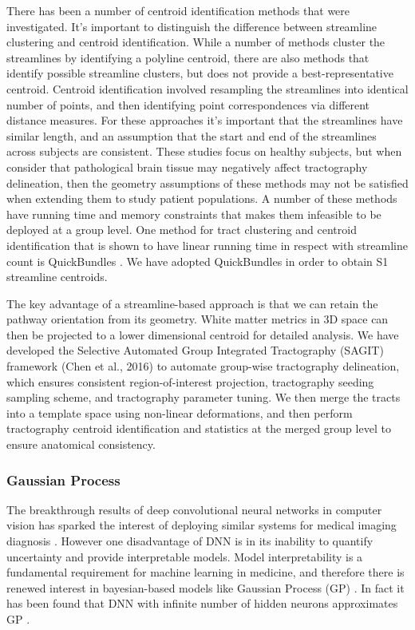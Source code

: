 There has been a number of centroid identification methods that were investigated. It’s important to distinguish the difference between streamline clustering and centroid identification. While a number of methods cluster the streamlines by identifying a polyline centroid, there are also methods that identify possible streamline clusters, but does not provide a best-representative centroid. Centroid identification involved resampling the streamlines into identical number of points, and then identifying point correspondences via different distance measures. For these approaches it’s important that the streamlines have similar length, and an assumption that the start and end of the streamlines across subjects are consistent. These studies focus on healthy subjects, but when consider that pathological brain tissue may negatively affect tractography delineation, then the geometry assumptions of these methods may not be satisfied when extending them to study patient populations. A number of these methods have running time and memory constraints that makes them infeasible to be deployed at a group level. One method for tract clustering and centroid identification that is shown to have linear running time in respect with streamline count is QuickBundles \cite{Garyfallidis2012}. We have adopted QuickBundles in order to obtain S1 streamline centroids. 

The key advantage of a streamline-based approach is that we can retain the pathway orientation from its geometry. White matter metrics in 3D space can then be projected to a lower dimensional centroid for detailed analysis. We have developed the Selective Automated Group Integrated Tractography (SAGIT) framework (Chen et al., 2016) to automate group-wise tractography delineation, which ensures consistent region-of-interest projection, tractography seeding sampling scheme, and tractography parameter tuning. We then merge the tracts into a template space using non-linear deformations, and then perform tractography centroid identification and statistics at the merged group level to ensure anatomical consistency. 

\subsubsection{Gaussian Process}
The breakthrough results of deep convolutional neural networks in computer vision \cite{Krizhevsky2012} has sparked the interest of deploying similar systems for medical imaging diagnosis \cite{Greenspan2016}. However one disadvantage of DNN is in its inability to quantify uncertainty and provide interpretable models. Model interpretability is a fundamental requirement for machine learning in medicine, and therefore there is renewed interest in bayesian-based models like Gaussian Process (GP) \cite{gal2016dropout}. In fact it has been found that DNN with infinite number of hidden neurons approximates GP \cite{neal1996priors}. 

